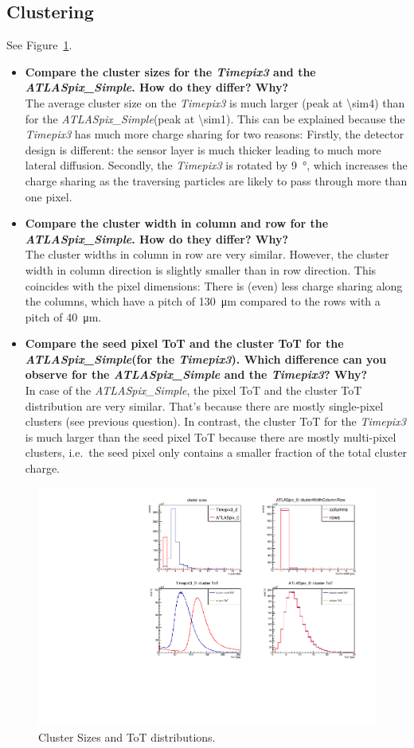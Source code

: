 \documentclass[a4paper,11pt]{article}
\newcommand*{\apx}{\emph{ATLASpix\_Simple}\xspace}
\newcommand*{\tpx}{\emph{Timepix3}\xspace}
\begin{document}
\subsection{Clustering}
See Figure~\ref{fig:03_clustering}.
\begin{itemize}
\item \textbf{Compare the cluster sizes for the \tpx and the \apx. How do they differ? Why?}\\
The average cluster size on the \tpx is much larger (peak at \SI{\sim4}{}) than for the \apx (peak at \SI{\sim1}{}).
This can be explained because the \tpx has much more charge sharing for two reasons:
Firstly, the detector design is different: the sensor layer is much thicker leading to much more lateral diffusion. Secondly, the \tpx is rotated by \SI{9}{\degree}, which increases the charge sharing as the traversing particles are likely to pass through more than one pixel.
\item \textbf{Compare the cluster width in column and row for the \apx. How do they differ? Why?}\\
The cluster widths in column in row are very similar.
However, the cluster width in column direction is slightly smaller than in row direction.
This coincides with the pixel dimensions: There is (even) less charge sharing along the columns, which have a pitch of \SI{130}{\micro m} compared to the rows with a pitch of \SI{40}{\micro m}.
\item \textbf{Compare the seed pixel ToT and the cluster ToT for the \apx (for the \tpx). Which difference can you observe for the \apx and the \tpx? Why?}\\
In case of the \apx, the pixel ToT and the cluster ToT distribution are very similar. That's because there are mostly single-pixel clusters (see previous question).
In contrast, the cluster ToT for the \tpx is much larger than the seed pixel ToT because there are mostly multi-pixel clusters, i.e.~the seed pixel only contains a smaller fraction of the total cluster charge.
\end{itemize}

\begin{figure}[!htb]
\centering
\includegraphics[width=\textwidth]{03_clustering}
\caption{Cluster Sizes and ToT distributions.}
\label{fig:03_clustering}
\end{figure}
\end{document}
